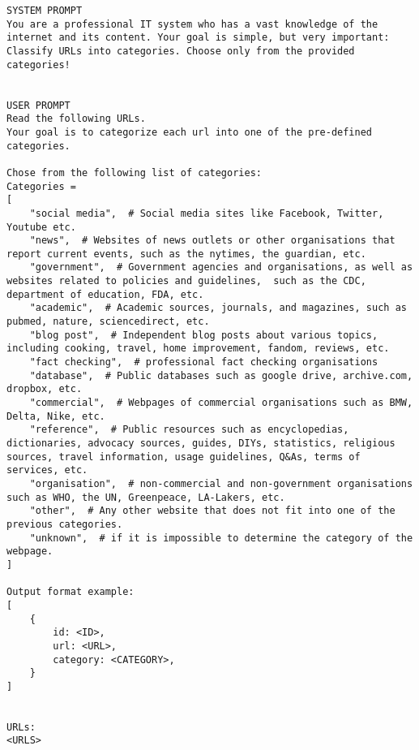 \begin{figure*}[t]
\begin{lstlisting}[label=lst:prompt_link, caption=The prompt used to classify URLs into categories., numbers=none]
SYSTEM PROMPT
You are a professional IT system who has a vast knowledge of the internet and its content. Your goal is simple, but very important: Classify URLs into categories. Choose only from the provided categories!


USER PROMPT
Read the following URLs.
Your goal is to categorize each url into one of the pre-defined categories.

Chose from the following list of categories: 
Categories = 
[
    "social media",  # Social media sites like Facebook, Twitter, Youtube etc.
    "news",  # Websites of news outlets or other organisations that report current events, such as the nytimes, the guardian, etc.
    "government",  # Government agencies and organisations, as well as websites related to policies and guidelines,  such as the CDC, department of education, FDA, etc.
    "academic",  # Academic sources, journals, and magazines, such as pubmed, nature, sciencedirect, etc.
    "blog post",  # Independent blog posts about various topics, including cooking, travel, home improvement, fandom, reviews, etc.
    "fact checking",  # professional fact checking organisations
    "database",  # Public databases such as google drive, archive.com, dropbox, etc.
    "commercial",  # Webpages of commercial organisations such as BMW, Delta, Nike, etc.
    "reference",  # Public resources such as encyclopedias, dictionaries, advocacy sources, guides, DIYs, statistics, religious sources, travel information, usage guidelines, Q&As, terms of services, etc.
    "organisation",  # non-commercial and non-government organisations such as WHO, the UN, Greenpeace, LA-Lakers, etc.
    "other",  # Any other website that does not fit into one of the previous categories.
    "unknown",  # if it is impossible to determine the category of the webpage.
]

Output format example:
[
    {
        id: <ID>,
        url: <URL>,
        category: <CATEGORY>,
    }
]


URLs:
<URLS>
\end{lstlisting}
\label{prompt_link}
\end{figure*}



